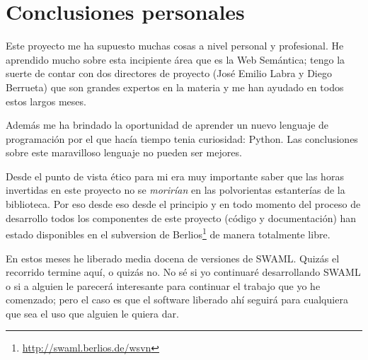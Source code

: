 
\section{Conclusiones personales}

Este proyecto me ha supuesto muchas cosas a nivel personal y profesional. He
aprendido mucho sobre esta incipiente área que es la Web Semántica; tengo la
suerte de contar con dos directores de proyecto (José Emilio Labra y Diego
Berrueta) que son grandes expertos en la materia y me han ayudado en todos 
estos largos meses.

Además me ha brindado la oportunidad de aprender un nuevo lenguaje de programación 
por el que hacía tiempo tenia curiosidad: Python. Las conclusiones sobre este 
maravilloso lenguaje no pueden ser mejores.

Desde el punto de vista ético para mi era muy importante saber que las horas
invertidas en este proyecto no se \emph{morirían} en las polvorientas estanterías
de la biblioteca. Por eso desde eso desde el principio y en todo momento del
proceso de desarrollo todos los componentes de este proyecto (código y 
documentación) han estado disponibles en el subversion de 
Berlios\footnote{\url{http://swaml.berlios.de/wsvn}} de manera totalmente
libre.

En estos meses he liberado media docena de versiones de SWAML. Quizás el recorrido
termine aquí, o quizás no. No sé si yo continuaré desarrollando SWAML o si a alguien
le parecerá interesante para continuar el trabajo que yo he comenzado; pero el caso
es que el software liberado ahí seguirá para cualquiera que sea el uso que alguien
le quiera dar.
